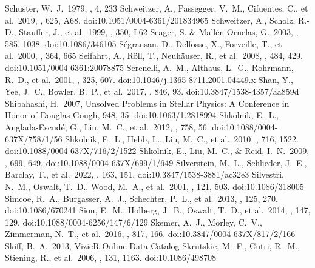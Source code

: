 \documentclass[twocolumn,tighten,twocolappendix]{aastex631}
\begin{document}
\begin{thebibliography}{}
 Schuster, W.~J.\ 1979, \rmxaa, 4, 233
 Schweitzer, A., Passegger, V.~M., Cifuentes, C., et al.\ 2019, \aap, 625, A68. doi:10.1051/0004-6361/201834965
 Schweitzer, A., Scholz, R.-D., Stauffer, J., et al.\ 1999, \aap, 350, L62
 Seager, S. \& Mall{\'e}n-Ornelas, G.\ 2003, \apj, 585, 1038. doi:10.1086/346105
 S{\'e}gransan, D., Delfosse, X., Forveille, T., et al.\ 2000, \aap, 364, 665
 Seifahrt, A., R{\"o}ll, T., Neuh{\"a}user, R., et al.\ 2008, \aap, 484, 429. doi:10.1051/0004-6361:20078875
 Serenelli, A.~M., Althaus, L.~G., Rohrmann, R.~D., et al.\ 2001, \mnras, 325, 607. doi:10.1046/j.1365-8711.2001.04449.x
 Shan, Y., Yee, J.~C., Bowler, B.~P., et al.\ 2017, \apj, 846, 93. doi:10.3847/1538-4357/aa859d
 Shibahashi, H.\ 2007, Unsolved Problems in Stellar Physics: A Conference in Honor of Douglas Gough, 948, 35. doi:10.1063/1.2818994
 Shkolnik, E.~L., Anglada-Escud{\'e}, G., Liu, M.~C., et al.\ 2012, \apj, 758, 56. doi:10.1088/0004-637X/758/1/56
 Shkolnik, E.~L., Hebb, L., Liu, M.~C., et al.\ 2010, \apj, 716, 1522. doi:10.1088/0004-637X/716/2/1522
 Shkolnik, E., Liu, M.~C., \& Reid, I.~N.\ 2009, \apj, 699, 649. doi:10.1088/0004-637X/699/1/649
 Silverstein, M.~L., Schlieder, J.~E., Barclay, T., et al.\ 2022, \aj, 163, 151. doi:10.3847/1538-3881/ac32e3
 Silvestri, N.~M., Oswalt, T.~D., Wood, M.~A., et al.\ 2001, \aj, 121, 503. doi:10.1086/318005
 Simcoe, R.~A., Burgasser, A.~J., Schechter, P.~L., et al.\ 2013, \pasp, 125, 270. doi:10.1086/670241
 Sion, E.~M., Holberg, J.~B., Oswalt, T.~D., et al.\ 2014, \aj, 147, 129. doi:10.1088/0004-6256/147/6/129
 Skemer, A.~J., Morley, C.~V., Zimmerman, N.~T., et al.\ 2016, \apj, 817, 166. doi:10.3847/0004-637X/817/2/166
 Skiff, B.~A.\ 2013, VizieR Online Data Catalog
 Skrutskie, M.~F., Cutri, R.~M., Stiening, R., et al.\ 2006, \aj, 131, 1163. doi:10.1086/498708

\end{thebibliography}
\end{document}
